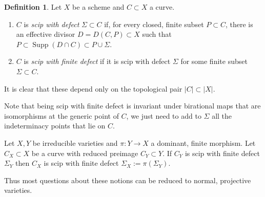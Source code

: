 \documentclass{amsart}
\theoremstyle{definition}
\newtheorem{defn}[thm]{Definition}
\theoremstyle{remark}
\newcommand{\supp}[0]{\operatorname{Supp}}
\begin{document}
\begin{defn}\label{ci.defn.3} Let $X$ be a scheme and  $C\subset X$ a curve. 
\begin{enumerate}
\item   $C$  is  {\it scip with  defect} $\Sigma\subset C$ if, 
for every closed, finite subset $P\subset C$, there is an effective divisor $D=D(C,P)\subset X$ 
such that $P\subset \supp(D\cap C)\subset P\cup \Sigma$.
\item  $C$  is  {\it scip with finite defect} if it is
 scip with  defect $\Sigma$
for some finite subset   $\Sigma\subset C$.
\end{enumerate}




It is clear that these depend only on the topological pair $|C|\subset |X|$.

Note that being   scip with finite defect is invariant under birational  maps that are isomorphisms at the generic point of $C$, we just need to add to $\Sigma$ all  the indeterminacy points that lie on $C$.

Let  $X,Y$ be irreducible varieties and $\pi:Y\to X$  a dominant, finite  morphism. Let $C_X\subset X$ be a curve with reduced preimage
$C_Y\subset Y$. If $C_Y$ is scip with finite defect $\Sigma_Y$ then
$C_X$ is scip with finite defect $\Sigma_X:=\pi(\Sigma_Y)$. 

Thus most questions about these notions can be reduced to  normal, projective varieties.
 \end{defn}
\end{document}
